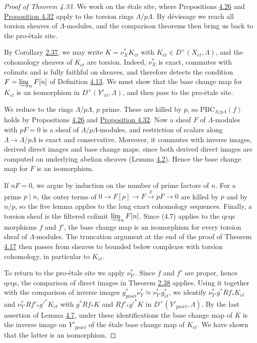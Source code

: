 \documentclass[11pt]{article}
\begin{document}
\begin{proof}[{Proof of Theorem 4.33}]\label{bp384}%
We work on the étale site, where Propositions \hyperref[bp360]{4.26} and \hyperref[bp378]{Proposition 4.32} apply to the torsion rings \(\Lambda/p\Lambda\). By dévissage we reach all torsion sheaves of \(\Lambda\)-modules, and the comparison theorems then bring us back to the pro-étale site.

By Corollary \hyperref[bp109]{2.37}, we may write \(K=\nu_X^*K_{\acute{e}t}\) with \(K_{\acute{e}t}\in D^+(X_{\acute{e}t},\Lambda)\), and the cohomology sheaves of \(K_{\acute{e}t}\) are torsion. Indeed, \(\nu_X^*\) is exact, commutes with colimits and is fully faithful on sheaves, and therefore detects the condition \(F=\varinjlim_nF[n]\) of Definition \hyperref[bp320]{4.13}. We must show that the base change map for \(K_{\acute{e}t}\) is an isomorphism in \(D^+(Y'_{\acute{e}t},\Lambda)\), and then pass to the pro-étale site.

We reduce to the rings \(\Lambda/p\Lambda\), \(p\) prime. These are killed by \(p\), so \(\mathrm{PBC}_{\Lambda/p\Lambda}(f)\) holds by Propositions \hyperref[bp360]{4.26} and \hyperref[bp378]{Proposition 4.32}. Now a sheaf \(F\) of \(\Lambda\)-modules with \(pF=0\) is a sheaf of \(\Lambda/p\Lambda\)-modules, and restriction of scalars along \(\Lambda\to\Lambda/p\Lambda\) is exact and conservative. Moreover, it commutes with inverse images, derived direct images and base change maps, since both derived direct images are computed on underlying abelian sheaves (Lemma \hyperref[bp292]{4.2}). Hence the base change map for \(F\) is an isomorphism.

If \(nF=0\), we argue by induction on the number of prime factors of \(n\). For a prime \(p\mid n\), the outer terms of \(0\to F[p]\to F\xrightarrow{p}pF\to0\) are killed by \(p\) and by \(n/p\), so the five lemma applies to the long exact cohomology sequences. Finally, a torsion sheaf is the filtered colimit \(\varinjlim_nF[n]\). Since (4.7) applies to the qcqs morphisms \(f\) and \(f'\), the base change map is an isomorphism for every torsion sheaf of \(\Lambda\)-modules. The truncation argument at the end of the proof of Theorem \hyperref[bp329]{4.17} then passes from sheaves to bounded below complexes with torsion cohomology, in particular to \(K_{\acute{e}t}\).

To return to the pro-étale site we apply \(\nu_{Y'}^*\). Since \(f\) and \(f'\) are proper, hence qcqs, the comparison of direct images in Theorem \hyperref[bp113]{2.38} applies. Using it together with the comparison of inverse images \(g_{\mathrm{pro}\acute{e}t}^*\nu_Y^*\simeq\nu_{Y'}^*g_{\acute{e}t}^*\), we identify \(\nu_{Y'}^*g^*Rf_*K_{\acute{e}t}\) and \(\nu_{Y'}^*Rf'_*g'^*K_{\acute{e}t}\) with \(g^*Rf_*K\) and \(Rf'_*g'^*K\) in \(D^+(Y'_{\mathrm{pro}\acute{e}t},\Lambda)\). By the last assertion of Lemma \hyperref[bp304]{4.7}, under these identifications the base change map of \(K\) is the inverse image on \(Y'_{\mathrm{pro}\acute{e}t}\) of the étale base change map of \(K_{\acute{e}t}\). We have shown that the latter is an isomorphism.
\end{proof}
\end{document}
